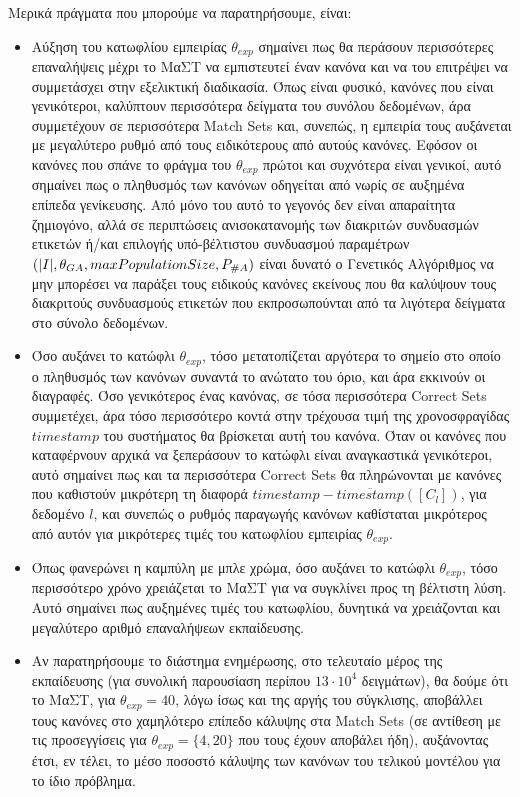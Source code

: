 Μερικά πράγματα που μπορούμε να παρατηρήσουμε, είναι:
\begin{itemize}
\item Αύξηση του κατωφλίου εμπειρίας $\theta_{exp}$ σημαίνει πως θα περάσουν περισσότερες επαναλήψεις μέχρι το ΜαΣΤ να εμπιστευτεί έναν κανόνα και να του επιτρέψει να συμμετάσχει στην εξελικτική διαδικασία. Όπως είναι φυσικό, κανόνες που είναι γενικότεροι, καλύπτουν περισσότερα δείγματα του συνόλου δεδομένων, άρα συμμετέχουν σε περισσότερα Match Sets και, συνεπώς, η εμπειρία τους αυξάνεται με μεγαλύτερο ρυθμό από τους ειδικότερους από αυτούς κανόνες. Εφόσον οι κανόνες που σπάνε το φράγμα του $\theta_{exp}$ πρώτοι και συχνότερα είναι γενικοί, αυτό σημαίνει πως ο πληθυσμός των κανόνων οδηγείται από νωρίς σε αυξημένα επίπεδα γενίκευσης. Από μόνο του αυτό το γεγονός δεν είναι απαραίτητα ζημιογόνο, αλλά σε περιπτώσεις ανισοκατανομής των διακριτών συνδυασμών ετικετών ή/και επιλογής υπό-βέλτιστου συνδυασμού παραμέτρων $(\lvert I\rvert, \theta_{GA}, maxPopulationSize, P_{\#A})$ είναι δυνατό ο Γενετικός Αλγόριθμος να μην μπορέσει να παράξει τους ειδικούς κανόνες εκείνους που θα καλύψουν τους διακριτούς συνδυασμούς ετικετών που εκπροσωπούνται από τα λιγότερα δείγματα στο σύνολο δεδομένων.

\item Όσο αυξάνει το κατώφλι $\theta_{exp}$, τόσο μετατοπίζεται αργότερα το σημείο στο οποίο ο πληθυσμός των κανόνων συναντά το ανώτατο του όριο, και άρα εκκινούν οι διαγραφές. Όσο γενικότερος ένας κανόνας, σε τόσα περισσότερα Correct Sets συμμετέχει, άρα τόσο περισσότερο κοντά στην τρέχουσα τιμή της χρονοσφραγίδας $timestamp$ του συστήματος θα βρίσκεται αυτή του κανόνα. Όταν οι κανόνες που καταφέρνουν αρχικά να ξεπεράσουν το κατώφλι είναι αναγκαστικά γενικότεροι, αυτό σημαίνει πως και τα περισσότερα Correct Sets θα πληρώνονται με κανόνες που καθιστούν μικρότερη τη διαφορά $timestamp - \overline{timestamp}([C_{l}])$, για δεδομένο $l$, και συνεπώς ο ρυθμός παραγωγής κανόνων καθίσταται μικρότερος από αυτόν για μικρότερες τιμές του κατωφλίου εμπειρίας $\theta_{exp}$.

\item Όπως φανερώνει η καμπύλη με μπλε χρώμα, όσο αυξάνει το κατώφλι $\theta_{exp}$, τόσο περισσότερο χρόνο χρειάζεται το ΜαΣΤ για να συγκλίνει προς τη βέλτιστη λύση. Αυτό σημαίνει πως αυξημένες τιμές του κατωφλίου, δυνητικά να χρειάζονται και μεγαλύτερο αριθμό επαναλήψεων εκπαίδευσης.

\item Αν παρατηρήσουμε το διάστημα ενημέρωσης, στο τελευταίο μέρος της εκπαίδευσης (για συνολική παρουσίαση περίπου $13 \cdot 10^{4}$ δειγμάτων), θα δούμε ότι το ΜαΣΤ, για $\theta_{exp}=40$, λόγω ίσως και της αργής του σύγκλισης, αποβάλλει τους κανόνες στο χαμηλότερο επίπεδο κάλυψης στα Match Sets (σε αντίθεση με τις προσεγγίσεις για $\theta_{exp}=\{4,20\}$ που τους έχουν αποβάλει ήδη), αυξάνοντας έτσι, εν τέλει, το μέσο ποσοστό κάλυψης των κανόνων του τελικού μοντέλου για το ίδιο πρόβλημα.
\end{itemize}


